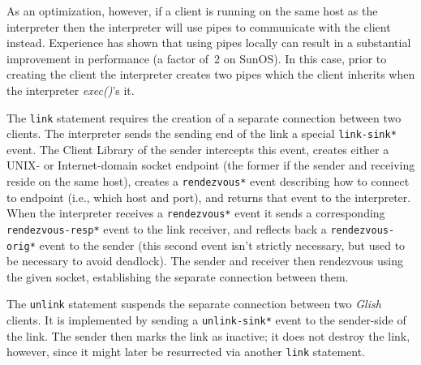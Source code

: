 \begin{sloppy}
As an optimization, however, if a client is running on the same host
as the interpreter then the interpreter will use pipes to communicate
with the client instead.  Experience has shown that using pipes
locally can result in a substantial improvement in performance (a
factor of~2 on SunOS).  In this case, prior to creating the client
the interpreter creates two pipes which the client inherits
when the interpreter {\em exec()\/}'s it.

The {\tt link} statement requires the creation of a separate connection
between two clients.  The interpreter sends the sending end of the link
a special
{\tt *link-sink*} event.  The Client Library of the sender intercepts
this event, creates either a UNIX- or Internet-domain socket endpoint
(the former if the sender and receiving reside on the same host),
creates a {\tt *rendezvous*}
event describing how to connect to endpoint (i.e., which host and port),
and returns that event to the interpreter.
When the interpreter receives a {\tt *rendezvous*} event it sends a
corresponding
{\tt *rendezvous-resp*} event
to the link receiver, and reflects back a
{\tt *rendezvous-orig*} event
to the sender (this second event isn't strictly necessary, but used to
be necessary to avoid deadlock).  The sender and receiver then rendezvous using the
given socket, establishing the separate connection between them.

The {\tt unlink} statement suspends the separate connection between two
{\em Glish} clients.  It is implemented by sending a
{\tt *unlink-sink*} event to the sender-side of the link.  The sender
then marks the link as inactive; it does not destroy the link, however,
since it might later be resurrected via another {\tt link} statement.


\end{sloppy}
